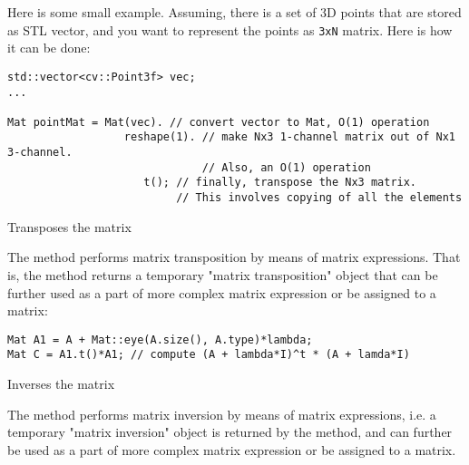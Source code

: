 Here is some small example. Assuming, there is a set of 3D points that are stored as STL vector, and you want to represent the points as \texttt{3xN} matrix. Here is how it can be done:

\begin{lstlisting}
std::vector<cv::Point3f> vec;
...

Mat pointMat = Mat(vec). // convert vector to Mat, O(1) operation
                  reshape(1). // make Nx3 1-channel matrix out of Nx1 3-channel.
                              // Also, an O(1) operation
                     t(); // finally, transpose the Nx3 matrix.
                          // This involves copying of all the elements
\end{lstlisting} 


Transposes the matrix


The method performs matrix transposition by means of matrix expressions.
That is, the method returns a temporary "matrix transposition" object that can be further used as a part of more complex matrix expression or be assigned to a matrix:

\begin{lstlisting}
Mat A1 = A + Mat::eye(A.size(), A.type)*lambda;
Mat C = A1.t()*A1; // compute (A + lambda*I)^t * (A + lamda*I)
\end{lstlisting} 

Inverses the matrix


\begin{description}
\begin{description}
\end{description}
\end{description}

The method performs matrix inversion by means of matrix expressions, i.e. a temporary "matrix inversion" object is returned by the method, and can further be used as a part of more complex matrix expression or be assigned to a matrix.

